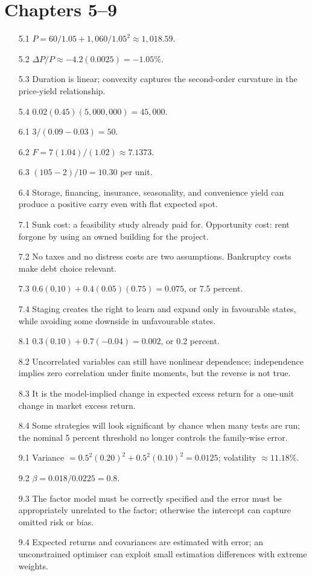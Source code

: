\section*{Chapters 5--9}
\begin{enumerate}
  \item[5.1] $P=60/1.05+1,060/1.05^2\approx1,018.59$.
  \item[5.2] $\Delta P/P\approx-4.2(0.0025)=-1.05\%$.
  \item[5.3] Duration is linear; convexity captures the second-order curvature in the price-yield relationship.
  \item[5.4] $0.02(0.45)(5,000,000)=45,000$.
  \item[6.1] $3/(0.09-0.03)=50$.
  \item[6.2] $F=7(1.04)/(1.02)\approx7.1373$.
  \item[6.3] $(105-2)/10=10.30$ per unit.
  \item[6.4] Storage, financing, insurance, seasonality, and convenience yield can produce a positive carry even with flat expected spot.
  \item[7.1] Sunk cost: a feasibility study already paid for. Opportunity cost: rent forgone by using an owned building for the project.
  \item[7.2] No taxes and no distress costs are two assumptions. Bankruptcy costs make debt choice relevant.
  \item[7.3] $0.6(0.10)+0.4(0.05)(0.75)=0.075$, or 7.5 percent.
  \item[7.4] Staging creates the right to learn and expand only in favourable states, while avoiding some downside in unfavourable states.
  \item[8.1] $0.3(0.10)+0.7(-0.04)=0.002$, or 0.2 percent.
  \item[8.2] Uncorrelated variables can still have nonlinear dependence; independence implies zero correlation under finite moments, but the reverse is not true.
  \item[8.3] It is the model-implied change in expected excess return for a one-unit change in market excess return.
  \item[8.4] Some strategies will look significant by chance when many tests are run; the nominal 5 percent threshold no longer controls the family-wise error.
  \item[9.1] Variance $=0.5^2(0.20)^2+0.5^2(0.10)^2=0.0125$; volatility $\approx11.18\%$.
  \item[9.2] $\beta=0.018/0.0225=0.8$.
  \item[9.3] The factor model must be correctly specified and the error must be appropriately unrelated to the factor; otherwise the intercept can capture omitted risk or bias.
  \item[9.4] Expected returns and covariances are estimated with error; an unconstrained optimiser can exploit small estimation differences with extreme weights.
\end{enumerate}

